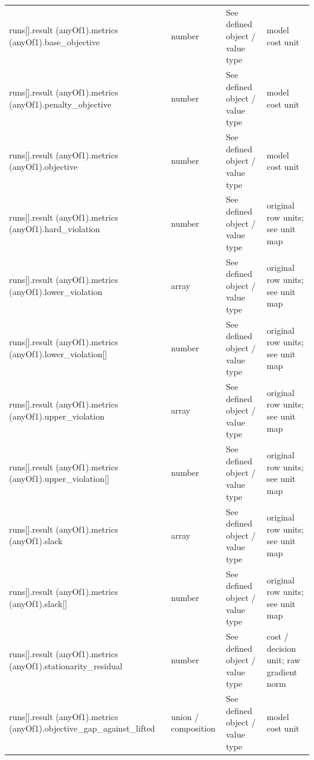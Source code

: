 \begin{longtable}{@{}>{\raggedright\arraybackslash}p{}>{\raggedright\arraybackslash}p{}>{\raggedright\arraybackslash}p{}>{\raggedright\arraybackslash}p{}@{}}
runs[].\allowbreak{}result (anyOf1).\allowbreak{}metrics (anyOf1).\allowbreak{}base\_\allowbreak{}objective & number & See defined object /\allowbreak{} value type & model cost unit\\
runs[].\allowbreak{}result (anyOf1).\allowbreak{}metrics (anyOf1).\allowbreak{}penalty\_\allowbreak{}objective & number & See defined object /\allowbreak{} value type & model cost unit\\
runs[].\allowbreak{}result (anyOf1).\allowbreak{}metrics (anyOf1).\allowbreak{}objective & number & See defined object /\allowbreak{} value type & model cost unit\\
runs[].\allowbreak{}result (anyOf1).\allowbreak{}metrics (anyOf1).\allowbreak{}hard\_\allowbreak{}violation & number & See defined object /\allowbreak{} value type & original row units; see unit map\\
runs[].\allowbreak{}result (anyOf1).\allowbreak{}metrics (anyOf1).\allowbreak{}lower\_\allowbreak{}violation & array & See defined object /\allowbreak{} value type & original row units; see unit map\\
runs[].\allowbreak{}result (anyOf1).\allowbreak{}metrics (anyOf1).\allowbreak{}lower\_\allowbreak{}violation[] & number & See defined object /\allowbreak{} value type & original row units; see unit map\\
runs[].\allowbreak{}result (anyOf1).\allowbreak{}metrics (anyOf1).\allowbreak{}upper\_\allowbreak{}violation & array & See defined object /\allowbreak{} value type & original row units; see unit map\\
runs[].\allowbreak{}result (anyOf1).\allowbreak{}metrics (anyOf1).\allowbreak{}upper\_\allowbreak{}violation[] & number & See defined object /\allowbreak{} value type & original row units; see unit map\\
runs[].\allowbreak{}result (anyOf1).\allowbreak{}metrics (anyOf1).\allowbreak{}slack & array & See defined object /\allowbreak{} value type & original row units; see unit map\\
runs[].\allowbreak{}result (anyOf1).\allowbreak{}metrics (anyOf1).\allowbreak{}slack[] & number & See defined object /\allowbreak{} value type & original row units; see unit map\\
runs[].\allowbreak{}result (anyOf1).\allowbreak{}metrics (anyOf1).\allowbreak{}stationarity\_\allowbreak{}residual & number & See defined object /\allowbreak{} value type & cost /\allowbreak{} decision unit; raw gradient norm\\
runs[].\allowbreak{}result (anyOf1).\allowbreak{}metrics (anyOf1).\allowbreak{}objective\_\allowbreak{}gap\_\allowbreak{}against\_\allowbreak{}lifted & union /\allowbreak{} composition & See defined object /\allowbreak{} value type & model cost unit\\

\end{longtable}
